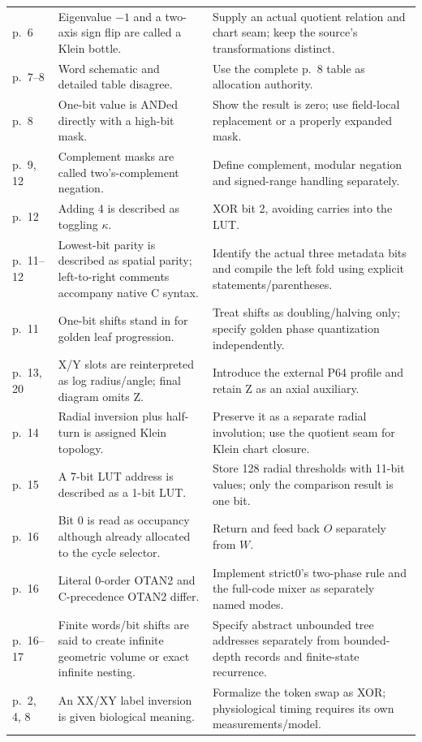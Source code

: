 \documentclass[11pt,a4paper]{article}
\numberwithin{equation}{section}
\begin{document}
\begin{longtable}{@{}>{\raggedright\arraybackslash}p{16mm}>{\raggedright\arraybackslash}p{51mm}>{\raggedright\arraybackslash}p{90mm}@{}}
p.~6 & Eigenvalue $-1$ and a two-axis sign flip are called a Klein bottle. & Supply an actual quotient relation and chart seam; keep the source's transformations distinct.\\
p.~7--8 & Word schematic and detailed table disagree. & Use the complete p.~8 table as allocation authority.\\
p.~8 & One-bit value is ANDed directly with a high-bit mask. & Show the result is zero; use field-local replacement or a properly expanded mask.\\
p.~9, 12 & Complement masks are called two's-complement negation. & Define complement, modular negation and signed-range handling separately.\\
p.~12 & Adding 4 is described as toggling $\kappa$. & XOR bit 2, avoiding carries into the LUT.\\
p.~11--12 & Lowest-bit parity is described as spatial parity; left-to-right comments accompany native C syntax. & Identify the actual three metadata bits and compile the left fold using explicit statements/parentheses.\\
p.~11 & One-bit shifts stand in for golden leaf progression. & Treat shifts as doubling/halving only; specify golden phase quantization independently.\\
p.~13, 20 & X/Y slots are reinterpreted as log radius/angle; final diagram omits Z. & Introduce the external P64 profile and retain Z as an axial auxiliary.\\
p.~14 & Radial inversion plus half-turn is assigned Klein topology. & Preserve it as a separate radial involution; use the quotient seam for Klein chart closure.\\
p.~15 & A 7-bit LUT address is described as a 1-bit LUT. & Store 128 radial thresholds with 11-bit values; only the comparison result is one bit.\\
p.~16 & Bit 0 is read as occupancy although already allocated to the cycle selector. & Return and feed back $O$ separately from $W$.\\
p.~16 & Literal 0-order OTAN2 and C-precedence OTAN2 differ. & Implement strict0's two-phase rule and the full-code mixer as separately named modes.\\
p.~16--17 & Finite words/bit shifts are said to create infinite geometric volume or exact infinite nesting. & Specify abstract unbounded tree addresses separately from bounded-depth records and finite-state recurrence.\\
p.~2, 4, 8 & An XX/XY label inversion is given biological meaning. & Formalize the token swap as XOR; physiological timing requires its own measurements/model.\\
\bottomrule
\end{longtable}
\normalsize
\end{document}
